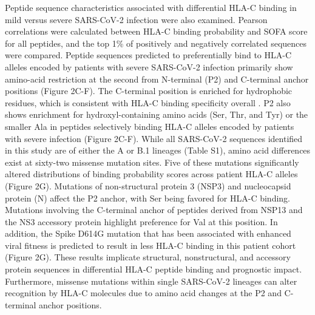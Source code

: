 \documentclass[utf8]{frontiersinFPHY_FAMS} %
\begin{document}
 Peptide sequence characteristics associated with differential HLA-C binding in mild versus severe SARS-CoV-2 infection were also examined. Pearson correlations were calculated between HLA-C binding probability and SOFA score for all peptides, and the top 1\% of positively and negatively correlated sequences were compared. Peptide sequences predicted to preferentially bind to HLA-C alleles encoded by patients with severe SARS-CoV-2 infection primarily show amino-acid restriction at the second from N-terminal (P2) and C-terminal anchor positions (Figure 2C-F). The C-terminal position is enriched for hydrophobic residues, which is consistent with HLA-C binding specificity overall \citep{25311805}. P2 also shows enrichment for hydroxyl-containing amino acids (Ser, Thr, and Tyr) or the smaller Ala in peptides selectively binding HLA-C alleles encoded by patients with severe infection (Figure 2C-F). While all SARS-CoV-2 sequences identified in this study are of either the A or B.1 lineages (Table S1), amino acid differences exist at sixty-two missense mutation sites. Five of these mutations significantly altered distributions of binding probability scores across patient HLA-C alleles (Figure 2G). Mutations of non-structural protein 3 (NSP3) and nucleocapsid protein (N) affect the P2 anchor, with Ser being favored for HLA-C binding. Mutations involving the C-terminal anchor of peptides derived from NSP13 and the NS3 accessory protein highlight preference for Val at this position. In addition, the Spike D614G mutation that has been associated with enhanced viral fitness is predicted to result in less HLA-C binding in this patient cohort (Figure 2G). These results implicate structural, nonstructural, and accessory protein sequences in differential HLA-C peptide binding and prognostic impact. Furthermore, missense mutations within single SARS-CoV-2 lineages can alter recognition by HLA-C molecules due to amino acid changes at the P2 and C-terminal anchor positions.
 
\end{document}
